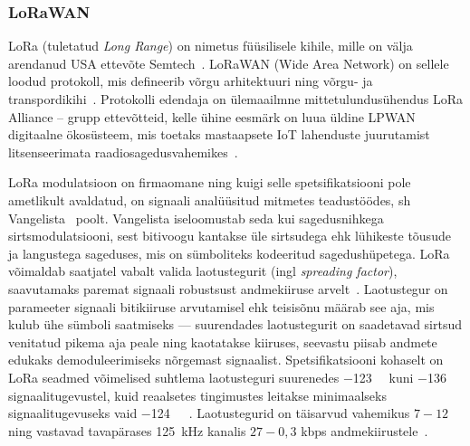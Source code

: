 \documentclass[12pt]{article}
\begin{document}
    \subsubsection{LoRaWAN}

    LoRa (tuletatud \textit{Long Range}) on nimetus füüsilisele kihile, mille on välja arendanud USA ettevõte Semtech~\cite{loraIntro}.
    LoRaWAN (Wide Area Network) on sellele loodud protokoll, mis defineerib võrgu arhitektuuri ning võrgu- ja transpordikihi~\cite{lorawanIntro}.
    Protokolli edendaja on ülemaailmne mittetulundusühendus LoRa Alliance -- grupp ettevõtteid, kelle ühine eesmärk on luua üldine LPWAN digitaalne ökosüsteem, mis toetaks mastaapsete IoT lahenduste juurutamist litsenseerimata raadiosagedusvahemikes~\cite{loraalliance}.

    LoRa modulatsioon on firmaomane ning kuigi selle spetsifikatsiooni pole ametlikult avaldatud, on signaali analüüsitud mitmetes teadustöödes, sh Vangelista~\cite{vangelista} poolt.
    Vangelista iseloomustab seda kui sagedusnihkega sirtsmodulatsiooni, sest bitivoogu kantakse üle sirtsudega ehk lühikeste tõusude ja langustega sageduses, mis on sümboliteks kodeeritud sagedushüpetega.
    LoRa võimaldab saatjatel vabalt valida laotustegurit (ingl \textit{spreading factor}), saavutamaks paremat signaali robustsust andmekiiruse arvelt~\cite{loramodulation}.
    Laotustegur on parameeter signaali bitikiiruse arvutamisel ehk teisisõnu määrab see aja, mis kulub ühe sümboli saatmiseks — suurendades laotustegurit on saadetavad sirtsud venitatud pikema aja peale ning kaotatakse kiiruses, seevastu piisab andmete edukaks demoduleerimiseks nõrgemast signaalist.
    Spetsifikatsiooni kohaselt on LoRa seadmed võimelised suhtlema laotusteguri suurenedes \SI{-123}{\deci\belm} kuni \SI{-136}{\deci\belm} signaalitugevustel, kuid reaalsetes tingimustes leitakse minimaalseks signaalitugevuseks vaid \SI{-124}{\deci\belm}~\cite{augustin2016study}.
    Laotustegurid on täisarvud vahemikus $7-12$ ning vastavad tavapärases \SI{125}{\kilo\hertz} kanalis $27-0{,}3$ kbps andmekiirustele~\cite{adelanto}.
\end{document}

